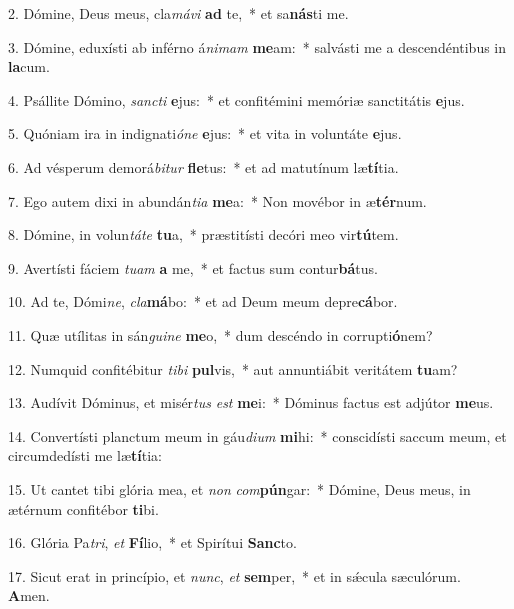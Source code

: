 2. Dómine, Deus meus, cla\textit{má}\textit{vi} \textbf{ad} te,~*  et sa\textbf{nás}ti me.\

3. Dómine, eduxísti ab inférno á\textit{ni}\textit{mam} \textbf{me}am:~*  salvásti me a descendéntibus in \textbf{la}cum.\

4. Psállite Dómino, \textit{sanc}\textit{ti} \textbf{e}jus:~*  et confitémini memóriæ sanctitátis \textbf{e}jus.\

5. Quóniam ira in indignati\textit{ó}\textit{ne} \textbf{e}jus:~*  et vita in voluntáte \textbf{e}jus.\

6. Ad vésperum demorá\textit{bi}\textit{tur} \textbf{fle}tus:~*  et ad matutínum læ\textbf{tí}tia.\

7. Ego autem dixi in abundán\textit{ti}\textit{a} \textbf{me}a:~*  Non movébor in æ\textbf{tér}num.\

8. Dómine, in volun\textit{tá}\textit{te} \textbf{tu}a,~*  præstitísti decóri meo vir\textbf{tú}tem.\

9. Avertísti fáciem \textit{tu}\textit{am} \textbf{a} me,~*  et factus sum contur\textbf{bá}tus.\

10. Ad te, Dómi\textit{ne}, \textit{cla}\textbf{má}bo:~*  et ad Deum meum depre\textbf{cá}bor.\

11. Quæ utílitas in sán\textit{gui}\textit{ne} \textbf{me}o,~*  dum descéndo in corrupti\textbf{ó}nem?\

12. Numquid confitébitur \textit{ti}\textit{bi} \textbf{pul}vis,~*  aut annuntiábit veritátem \textbf{tu}am?\

13. Audívit Dóminus, et misér\textit{tus} \textit{est} \textbf{me}i:~*  Dóminus factus est adjútor \textbf{me}us.\

14. Convertísti planctum meum in gáu\textit{di}\textit{um} \textbf{mi}hi:~*  conscidísti saccum meum, et circumdedísti me læ\textbf{tí}tia:\

15. Ut cantet tibi glória mea, et \textit{non} \textit{com}\textbf{pún}gar:~*  Dómine, Deus meus, in ætérnum confitébor \textbf{ti}bi.\

16. Glória Pa\textit{tri}, \textit{et} \textbf{Fí}lio,~*  et Spirítui \textbf{Sanc}to.\

17. Sicut erat in princípio, et \textit{nunc}, \textit{et} \textbf{sem}per,~*  et in sǽcula sæculórum. \textbf{A}men.\

